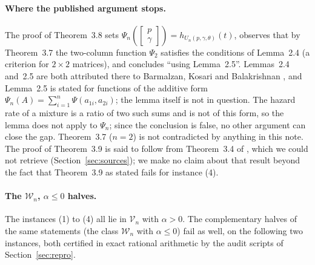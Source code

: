 \documentclass[10pt]{article}
\theoremstyle{plain}
\theoremstyle{definition}
\theoremstyle{remark}
\begin{document}
\paragraph{Where the published argument stops.} The proof of Theorem~3.8 sets $\Psi_n([\begin{smallmatrix}p\\ \gamma\end{smallmatrix}])=h_{U_n(p,\gamma,\theta)}(t)$, observes that by Theorem~3.7 the two-column function $\Psi_2$ satisfies the conditions of Lemma~2.4 (a criterion for $2\times 2$ matrices), and concludes ``using Lemma~2.5''. Lemmas~2.4 and~2.5 are both attributed there to Barmalzan, Kosari and Balakrishnan \cite{BarmalzanKosariBalakrishnan2022}, and Lemma~2.5 is stated for functions of the additive form $\Psi_n(A)=\sum_{i=1}^n\Psi(a_{1i},a_{2i})$; the lemma itself is not in question. The hazard rate of a mixture is a ratio of two such sums and is not of this form, so the lemma does not apply to $\Psi_n$; since the conclusion is false, no other argument can close the gap. Theorem~3.7 ($n=2$) is not contradicted by anything in this note. The proof of Theorem~3.9 is said to follow from Theorem~3.4 of \cite{HazraFinkelstein2018}, which we could not retrieve (Section~\ref{sec:sources}); we make no claim about that result beyond the fact that Theorem~3.9 as stated fails for instance (4).

\paragraph{The $\mathcal W_n$, $\alpha\le0$ halves.} The instances (1) to (4) all lie in $\mathcal V_n$ with $\alpha>0$. The complementary halves of the same statements (the class $\mathcal W_n$ with $\alpha\le0$) fail as well, on the following two instances, both certified in exact rational arithmetic by the audit scripts of Section~\ref{sec:repro}.
\end{document}
